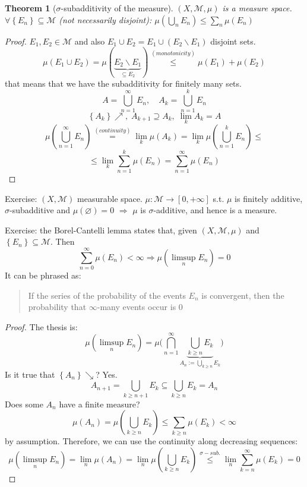 \documentclass[a4paper,12pt]{article}
\theoremstyle{break}
\newtheorem{theorem}{Theorem}[section]
\let\emptyset\varnothing
\numberwithin{equation}{section}
\begin{document}
\begin{theorem}[\(\sigma\)-subadditivity of the measure]
\((X, \mathcal{M}, \mu)\) is a measure space. \(\forall \left\lbrace E_n \right\rbrace \subseteq \mathcal{M}\) (not necessarily disjoint): \(\mu\left(\bigcup_n E_n\right) \leq \sum_n \mu(E_n)\)
\end{theorem}
\begin{proof}
    \(E_1, E_2 \in \mathcal{M}\) and also \(E_1 \cup E_2 = E_1 \cup (E_2 \backslash E_1)\) disjoint sets.
    \[
        \mu(E_1 \cup E_2) = \mu(\underbrace{E_2 \backslash E_1}_{\subseteq E_2}) \overset{(monotonicity)}{\leq} \mu(E_1) + \mu(E_2)
    \]
    that means that we have the subadditivity for finitely many sets.
    \[
        A = \bigcup_{n=1}^{\infty} E_n, \quad A_k = \bigcup_{n = 1}^{k} E_n
    \]
    \[
        \left\lbrace A_k \right\rbrace \nearrow, \; A_{k+1} \supseteq A_k, \; \lim_k A_k = A
    \]
    \[
        \mu\left(\bigcup_{n = 1}^{\infty} E_n\right) \overset{(continuity)}{=} \lim_k \mu(A_k) = \lim_k \mu \left(\bigcup_{n=1}^{k} E_n\right) \leq
        \]
        \[
            \leq \lim_k \sum_{n=1}^k \mu(E_n) = \sum_{n = 1}^{\infty} \mu(E_n)
        \]
\end{proof}
Exercise: \((X, \mathcal{M})\) measurable space. \(\mu : \mathcal{M} \to [0, +\infty]\) s.t. \(\mu\) is finitely additive, \(\sigma\)-subadditive and \(\mu(\emptyset) = 0\) \(\Longrightarrow\) \(\mu\) is \(\sigma\)-additive, and hence is a measure.  

Exercise: the Borel-Cantelli lemma states that, given \((X, \mathcal{M}, \mu)\) and \(\left\lbrace E_n \right\rbrace \subseteq \mathcal{M}\). Then
\[
    \sum_{n=0}^{\infty} \mu(E_n) < \infty \Longrightarrow \mu(\limsup_n E_n) = 0
\]
It can be phrased as: \begin{quote}
    If the series of the probability of the events \(E_n\) is convergent, then the probability that \(\infty\)-many events occur is \(0\)
\end{quote}
\begin{proof}
    The thesis is: \[\mu(\limsup_n E_n) = \mu\biggl(\bigcap_{n=1}^{\infty} \underbrace{\bigcup_{k \geq n} E_k}_{A_n := \bigcup_{k\geq n}E_k}\biggr)\]
    Is it true that \(\left\lbrace A_n \right\rbrace \searrow\)? Yes.
    \[
         A_{n+1} = \bigcup_{k \geq n+1}  E_k \subseteq \bigcup_{k \geq n} E_k = A_n
    \]
    Does some \(A_n\) have a finite measure? 
    \[
        \mu(A_n) = \mu\left(\bigcup_{k \geq n} E_k\right) \leq \sum_{k \geq n} \mu(E_k) < \infty
    \]
    by assumption. Therefore, we can use the continuity along decreasing sequences: 
    \[
        \mu(\limsup_n E_n) = \lim_n \mu(A_n) = \lim_n \mu \left(\bigcup_{k \geq n} E_k\right) \overset{\sigma-sub.}{\leq} \lim_n \sum_{k=n}^{\infty} \mu(E_k) = 0
    \]
\end{proof}
\end{document}

